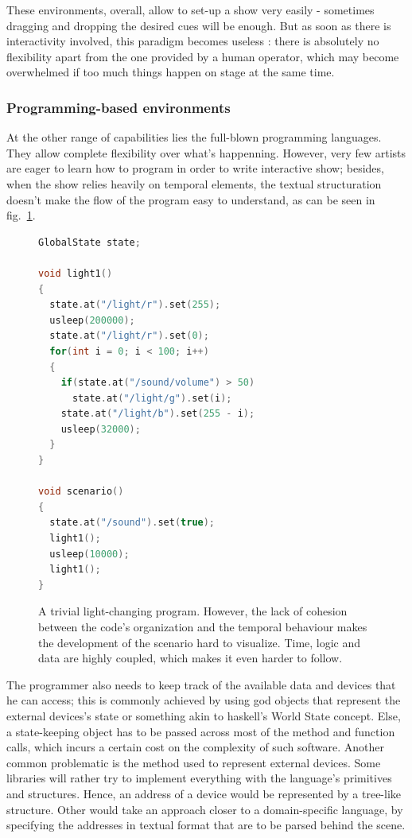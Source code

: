 \documentclass{sigchi}
\begin{document}
These environments, overall, allow to set-up a show very easily - sometimes dragging and dropping the desired cues will be enough. But as soon as there is interactivity involved, this paradigm becomes useless : there is absolutely no flexibility apart from the one provided by a human operator, which may become overwhelmed if too much things happen on stage at the same time.

\subsubsection{Programming-based environments}
At the other range of capabilities lies the full-blown programming languages. They allow complete flexibility over what's happenning. However, very few artists are eager to learn how to program in order to write interactive show; besides, when the show relies heavily on temporal elements, the textual structuration doesn't make the flow of the program easy to understand, as can be seen in fig.~\ref{fig.hardtofollow}.

\begin{figure}
\label{fig.hardtofollow}
\begin{lstlisting}[language=c++]
GlobalState state;

void light1()
{
  state.at("/light/r").set(255);
  usleep(200000);    
  state.at("/light/r").set(0);
  for(int i = 0; i < 100; i++)
  {
    if(state.at("/sound/volume") > 50)
      state.at("/light/g").set(i);        
    state.at("/light/b").set(255 - i);
    usleep(32000);
  }
}

void scenario()
{
  state.at("/sound").set(true);
  light1();
  usleep(10000);
  light1();
}
\end{lstlisting}
\caption{A trivial light-changing program. However, the lack of cohesion between the code's organization and the temporal behaviour makes the development of the scenario hard to visualize. Time, logic and data are highly coupled, which makes it even harder to follow.}
\end{figure}

The programmer also needs to keep track of the available data and devices that he can access; this is commonly achieved by using god objects that represent the external devices's state or something akin to haskell's World State concept. Else, a state-keeping object has to be passed across most of the method and function calls, which incurs a certain cost on the complexity of such software. Another common problematic is the method used to represent external devices. Some libraries will rather try to implement everything with the language's primitives and structures. Hence, an address of a device would be represented by a tree-like structure. Other would take an approach closer to a domain-specific language, by specifying the addresses in textual format that are to be parsed behind the scene. 
\end{document}
